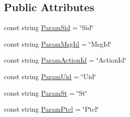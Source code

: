 \subsection*{Public Attributes}
\begin{DoxyCompactItemize}
\item 
const string \mbox{\hyperlink{class_t_net_1_1_contract_1_1_http_get_ae375afb9cd64d0acb89c6f17f7a4463c}{Param\+Sid}} = \char`\"{}Sid\char`\"{}
\item 
const string \mbox{\hyperlink{class_t_net_1_1_contract_1_1_http_get_a435855e4bb0eb5105642de5cf79f9ebe}{Param\+Msg\+Id}} = \char`\"{}Msg\+Id\char`\"{}
\item 
const string \mbox{\hyperlink{class_t_net_1_1_contract_1_1_http_get_a1565147483898b7080c64af08e737619}{Param\+Action\+Id}} = \char`\"{}Action\+Id\char`\"{}
\item 
const string \mbox{\hyperlink{class_t_net_1_1_contract_1_1_http_get_a5ffbd4905b818012cdd174a6c24a8581}{Param\+Uid}} = \char`\"{}Uid\char`\"{}
\item 
const string \mbox{\hyperlink{class_t_net_1_1_contract_1_1_http_get_a086e61c1256ef61646f2657437f84826}{Param\+St}} = \char`\"{}St\char`\"{}
\item 
const string \mbox{\hyperlink{class_t_net_1_1_contract_1_1_http_get_a238f8a316cb9ccc2e261e93bc2ff3591}{Param\+Ptcl}} = \char`\"{}Ptcl\char`\"{}
\end{DoxyCompactItemize}
